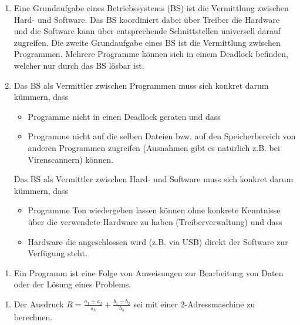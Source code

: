 \documentclass[ngerman]{fbi-aufgabenblatt}
\begin{document}



\begin{enumerate}
	\item Eine Grundaufgabe eines Betriebssystems (BS) ist die Vermittlung zwischen Hard- und Software. Das BS koordiniert dabei über Treiber die Hardware und die Software kann über entsprechende Schnittstellen universell darauf zugreifen.
	Die zweite Grundaufgabe eines BS ist die Vermittlung zwischen Programmen. Mehrere Programme können sich in einem Deadlock befinden, welcher nur durch das BS lösbar ist.
	
	\item Das BS als Vermittler zwischen Programmen muss sich konkret darum kümmern, dass
	\begin{itemize}
		\item Programme nicht in einen Deadlock geraten und dass
		\item Programme nicht auf die selben Dateien bzw. auf den Speicherbereich von anderen Programmen zugreifen (Ausnahmen gibt es natürlich z.B. bei Virenscannern) können.
	\end{itemize}
	Das BS als Vermittler zwischen Hard- und Software muss sich konkret
darum kümmern, dass
	\begin{itemize}
		\item Programme Ton wiedergeben lassen können ohne konkrete Kenntnisse über die verwendete Hardware zu haben (Treiberverwaltung) und dass
		\item Hardware die angeschlossen wird (z.B. via USB) direkt der Software zur Verfügung steht.
	\end{itemize}
\end{enumerate}


\begin{enumerate}
	\item Ein Programm ist eine Folge von Anweisungen zur Bearbeitung von Daten oder der Lösung eines Problems.
\end{enumerate}
%


\begin{enumerate}
	\item Der Ausdruck $R = \frac{a_{1} + a_{2}}{a_{3}} + \frac{b_{1} - b_{2}}{b_{3}}$ sei mit einer 2-Adressmaschine zu berechnen.
\end{enumerate}
\end{document}
